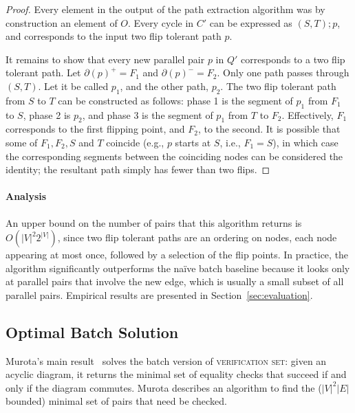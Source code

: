 \documentclass[sigplan,review,nonacm=true]{acmart}
\begin{document}
\begin{proof}
    Every element in the output of the path extraction algorithm was by construction an element of $O$. Every cycle in $C'$ can be expressed as $(S, T) ; p$, and corresponds to the input two flip tolerant path $p$.
    
    It remains to show that every new parallel pair $p$ in $Q'$ corresponds to a two flip tolerant path.
    Let $\partial(p)^+ = F_1$ and $\partial(p)^- = F_2$. 
    Only one path passes through $(S, T)$. Let it be called $p_1$, and the other path, $p_2$.
    The two flip tolerant path from $S$ to $T$ can be constructed as follows: phase 1 is the segment of $p_1$ from $F_1$ to $S$, phase 2 is $p_2$, and phase 3 is the segment of $p_1$ from $T$ to $F_2$.
    Effectively, $F_1$ corresponds to the first flipping point, and $F_2$, to the second.
    It is possible that some of $F_1, F_2, S$ and $T$ coincide (e.g., $p$ starts at $S$, i.e., $F_1 = S$), in which case the corresponding segments between the coinciding nodes can be considered the identity; the resultant path simply has fewer than two flips.
\end{proof}

\paragraph{Analysis}
An upper bound on the number of pairs that this algorithm returns is $O(|V|^{2} 2^{|V|})$, since two flip tolerant paths are an ordering on nodes, each node appearing at most once, followed by a selection of the flip points.
In practice, the algorithm significantly outperforms the na\"{i}ve batch baseline because it looks only at parallel pairs that involve the new edge, which is usually a small subset of all parallel pairs.
Empirical results are presented in Section~\ref{sec:evaluation}.

\subsection{Optimal Batch Solution}

\label{sec:batchBaseline}

Murota's main result~\cite{commutative} solves the batch version of \textsc{verification set}: given an acyclic diagram, it returns the minimal set of equality checks that succeed if and only if the diagram commutes.
Murota describes an algorithm to find the ($|V|^2|E|$ bounded) minimal set of pairs that need be checked.
\end{document}
